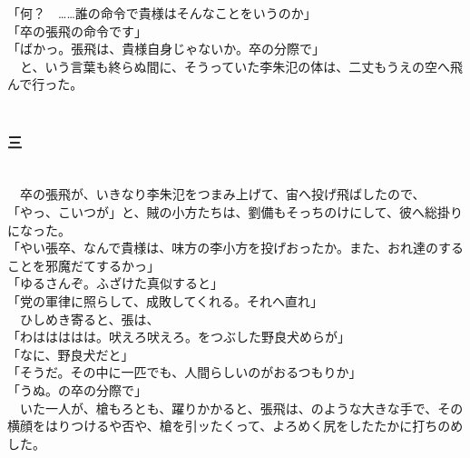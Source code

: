 \documentclass[
  paper=a5,
  fontsize=10pt,
  jafontsize=9.5pt,
  tate,                  %
  open_bracket_pos=nibu, %
]{jlreq}
\begin{document}
「何？　……誰の命令で貴様はそんなことをいうのか」\\


「卒の張飛の命令です」\\


「ばかっ。張飛は、貴様自身じゃないか。卒の分際で」\\


　と、いう言葉も終らぬ間に、そうっていた李朱氾の体は、二丈もうえの空へ飛んで行った。\\

\\

\subsubsection{三}

\\


　卒の張飛が、いきなり李朱氾をつまみ上げて、宙へ投げ飛ばしたので、\\


「やっ、こいつが」と、賊の小方たちは、劉備もそっちのけにして、彼へ総掛りになった。\\


「やい張卒、なんで貴様は、味方の李小方を投げおったか。また、おれ達のすることを邪魔だてするかっ」\\


「ゆるさんぞ。ふざけた真似すると」\\


「党の軍律に照らして、成敗してくれる。それへ直れ」\\


　ひしめき寄ると、張は、\\


「わははははは。吠えろ吠えろ。をつぶした野良犬めらが」\\


「なに、野良犬だと」\\


「そうだ。その中に一匹でも、人間らしいのがおるつもりか」\\


「うぬ。の卒の分際で」\\


　いた一人が、槍もろとも、躍りかかると、張飛は、のような大きな手で、その横顔をはりつけるや否や、槍を引ッたくって、よろめく尻をしたたかに打ちのめした。\\
\end{document}
